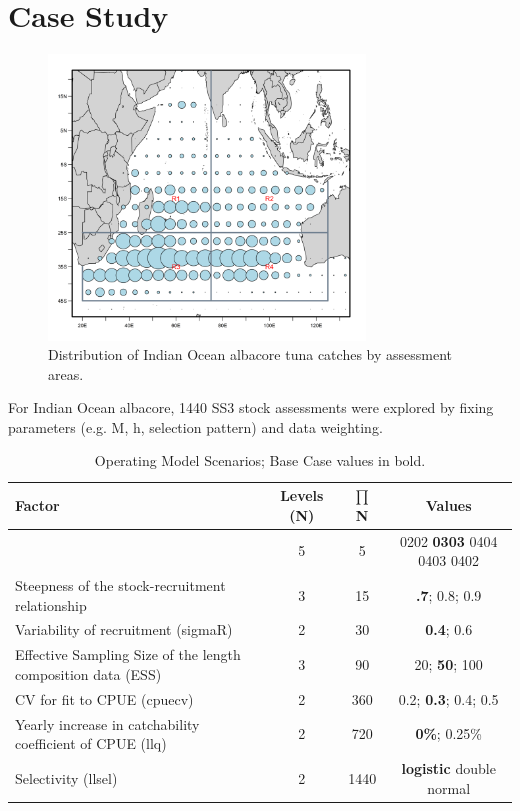 \newpage
\section*{Case Study}

\begin{figure}[ht!]\centering\includegraphics[width=0.75\textwidth]{figures/alb-map.png} 
\caption{Distribution of Indian Ocean albacore tuna catches by assessment areas.}
\label{fig:map}
\end{figure}

For Indian Ocean albacore, 1440 SS3 stock assessments were explored by fixing parameters (e.g. M, h, selection pattern) and data weighting. 


\begin{table}[ht]
\label{tab:grid}
\caption{Operating Model Scenarios; Base Case values in bold.}  
\begin{center}
\label{tab:datasumm}
\small

\begin{tabular}{|lccc|}

\hline
Factor & {Levels (N)} & {$\prod$ N} & {Values} \\ %
\hline\hline
{Natural mortality (M)& {5}}  & {  5}  & { 0202  \textbf{0303} 0404 0403 0402}    \\
{Steepness of the stock-recruitment relationship}}& {3} 	 & {15}  & { \textbf{.7}; 0.8; 0.9} \\
{Variability of recruitment (sigmaR)}& {2} 	 & { 30}  & { \textbf{0.4}; 0.6} \\
{Effective Sampling Size of the length composition data (ESS)}& {3} & { 90}  & { 20; \textbf{50}; 100} \\
{CV for fit to CPUE (cpuecv)}& {2} 	 & { 360}  & { 0.2;  \textbf{0.3}; 0.4; 0.5} \\
{Yearly increase in catchability coefficient of CPUE (llq)}& {2} 	 & {  720}  & { \textbf{0\%}; 0.25\%} \\
  {Selectivity (llsel)}& {2}}& {1440}} & { \textbf{logistic} double normal} \\
\hline

\end{tabular}
\end{center}
\end{table}

